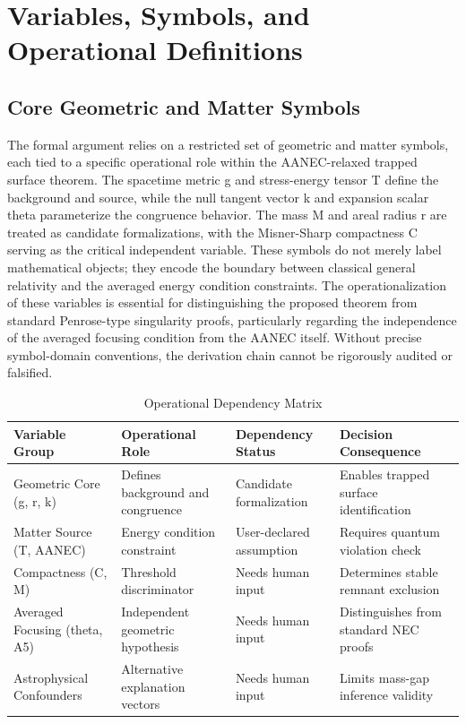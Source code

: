 \documentclass[conference]{IEEEtran}
\begin{document}
\section{Variables, Symbols, and Operational Definitions}
\subsection{Core Geometric and Matter Symbols}
The formal argument relies on a restricted set of geometric and matter symbols, each tied to a specific operational role within the AANEC-relaxed trapped surface theorem. The spacetime metric g and stress-energy tensor T define the background and source, while the null tangent vector k and expansion scalar theta parameterize the congruence behavior. The mass M and areal radius r are treated as candidate formalizations, with the Misner-Sharp compactness C serving as the critical independent variable. These symbols do not merely label mathematical objects; they encode the boundary between classical general relativity and the averaged energy condition constraints. The operationalization of these variables is essential for distinguishing the proposed theorem from standard Penrose-type singularity proofs, particularly regarding the independence of the averaged focusing condition from the AANEC itself. Without precise symbol-domain conventions, the derivation chain cannot be rigorously audited or falsified.

\begin{table}[htbp]
\centering
\footnotesize
\setlength{\tabcolsep}{3pt}
\renewcommand{\arraystretch}{1.12}
\caption{Operational Dependency Matrix}
\label{tab:appendix-variables-and-definitions-blk-2}
\begin{tabular}{|p{}|p{}|p{}|p{}|}
\hline
Variable Group & Operational Role & Dependency Status & Decision Consequence \\\hline
Geometric Core (g, r, k) & Defines background and congruence & Candidate formalization & Enables trapped surface identification \\\hline
Matter Source (T, AANEC) & Energy condition constraint & User-declared assumption & Requires quantum violation check \\\hline
Compactness (C, M) & Threshold discriminator & Needs human input & Determines stable remnant exclusion \\\hline
Averaged Focusing (theta, A5) & Independent geometric hypothesis & Needs human input & Distinguishes from standard NEC proofs \\\hline
Astrophysical Confounders & Alternative explanation vectors & Needs human input & Limits mass-gap inference validity \\\hline
\end{tabular}
\end{table}
\end{document}
